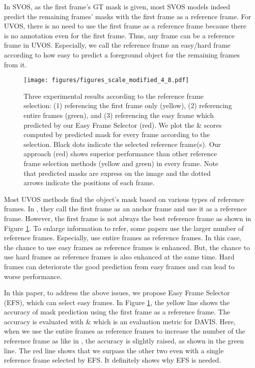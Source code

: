 \documentclass[letterpaper]{article} \usepackage{aaai22}  \usepackage{times}  \usepackage{helvet}  \usepackage{courier}  \usepackage[hyphens]{url}  \usepackage{graphicx} \urlstyle{rm} \def\UrlFont{\rm}  \usepackage{natbib}  \usepackage{caption} \DeclareCaptionStyle{ruled}{labelfont=normalfont,labelsep=colon,strut=off} \frenchspacing  \setlength{\pdfpagewidth}{8.5in}  \setlength{\pdfpageheight}{11in}  \usepackage{algorithm}
\begin{document}
In SVOS, as the first frame’s GT mask is given, most SVOS models indeed predict the remaining frames’ masks with the first frame as a reference frame. 
For UVOS, there is no need to use the first frame as a reference frame because there is no annotation even for the first frame. Thus, any frame can be a reference frame in UVOS. Especially, we call the reference frame an easy/hard frame according to how easy to predict a foreground object for the remaining frames from it.

\begin{figure}[t]
\centering
\texttt{[image: figures/figures\_scale\_modified\_4\_8.pdf]}
\caption{Three experimental results according to the reference frame selection: (1) referencing the first frame only (yellow), (2) referencing entire frames (green), and (3) referencing the easy frame which predicted by our Easy Frame Selector (red).
We plot the \& scores computed by predicted mask for every frame according to the selection. Black dots indicate the selected reference frame(s).
Our approach (red) shows superior performance than other reference frame selection methods (yellow and green) in every frame. Note that predicted masks are express on the image and the dotted arrows indicate the positions of each frame.
}
\label{figure1}
\end{figure}

Most UVOS methods \citep{tokmakov2017learning,jain2017fusionseg,tokmakov2017learning2,cheng2017segflow,song2018pyramid,yang2019anchor,lu2019see,wang2019learning,faisal2019exploiting,siam2019video,tokmakov2019learning,zhou2020motion,zhuo2019unsupervised} find the object’s mask based on various types of reference frames. In \citet{yang2019anchor}, they call the first frame as an anchor frame and use it as a reference frame. However, the first frame is not always the best reference frame as shown in Figure \ref{figure1}. To enlarge information to refer, some papers \citep{tokmakov2017learning,song2018pyramid,lu2019see,wang2019learning,faisal2019exploiting,tokmakov2019learning,zhuo2019unsupervised} use the larger number of reference frames.  Especially, \citet{song2018pyramid,wang2019learning,faisal2019exploiting} use entire frames as reference frames.
In this case, the chance to use easy frames as reference frames is enhanced. But, the chance to use hard frames as reference frames is also enhanced at the same time. Hard frames can deteriorate the good prediction from easy frames and can lead to worse performance. 

In this paper, to address the above issues, we propose Easy Frame Selector (EFS), which can select easy frames. In Figure \ref{figure1}, the yellow line shows the accuracy of mask prediction using the first frame as a reference frame. The accuracy is evaluated with \& which is an evaluation metric for DAVIS. Here, when we use the entire frames as reference frames to increase the number of the reference frame as like in \citet{song2018pyramid,wang2019learning,faisal2019exploiting}, the accuracy is slightly raised, as shown in the green line. 
The red line shows that we surpass the other two even with a single reference frame selected by EFS. It definitely shows why EFS is needed.
\end{document}
